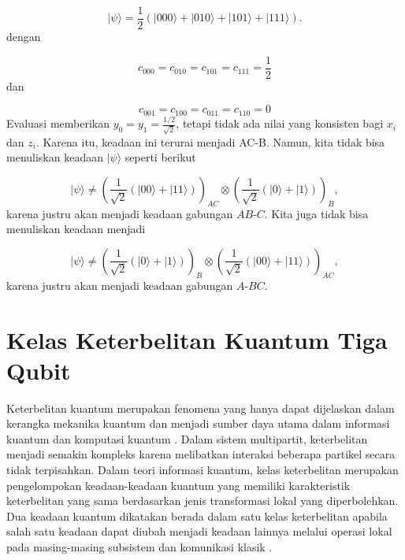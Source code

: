 \begin{equation}
	|\psi\rangle
	=
	\frac{1}{2}
	\left(
	|000\rangle + |010\rangle + |101\rangle + |111\rangle
	\right) .
\end{equation}
dengan

\begin{equation}
	c_{000}=c_{010}=c_{101}=c_{111}=\frac{1}{2}
\end{equation}
dan

\begin{equation}
	c_{001}=c_{100}=c_{011}=c_{110}=0
\end{equation}
Evaluasi memberikan $y_0=y_1=\frac{1/2}{\sqrt{2}}$, tetapi tidak ada nilai yang konsisten bagi $x_i$ dan $z_i$. Karena itu, keadaan ini terurai menjadi AC-B. Namun, kita tidak bisa menuliskan keadaan $|\psi\rangle$ seperti berikut

\begin{equation}
	|\psi\rangle
	\neq
	\left(
	\frac{1}{\sqrt{2}}
	(|00\rangle + |11\rangle)
	\right)_{AC}
	\otimes
	\left(
	\frac{1}{\sqrt{2}}
	(|0\rangle + |1\rangle)
	\right)_B ,
\end{equation}
karena justru akan menjadi keadaan gabungan $AB$-$C$. Kita juga tidak bisa menuliskan keadaan menjadi

\begin{equation}
	|\psi\rangle
	\neq
	\left(
	\frac{1}{\sqrt{2}}
	(|0\rangle + |1\rangle)
	\right)_B
	\otimes
	\left(
	\frac{1}{\sqrt{2}}
	(|00\rangle + |11\rangle)
	\right)_{AC} ,
\end{equation}
karena justru akan menjadi keadaan gabungan $A$-$BC$.

\section{Kelas Keterbelitan Kuantum Tiga Qubit}
\par
Keterbelitan kuantum merupakan fenomena yang hanya dapat dijelaskan dalam kerangka mekanika kuantum dan menjadi sumber daya utama dalam informasi kuantum dan komputasi kuantum \cite{horodecki2009quantum}. Dalam sistem multipartit, keterbelitan menjadi semakin kompleks karena melibatkan interaksi beberapa partikel secara tidak terpisahkan. Dalam teori informasi kuantum, kelas keterbelitan merupakan pengelompokan keadaan-keadaan kuantum yang memiliki karakteristik keterbelitan yang sama berdasarkan jenis transformasi lokal yang diperbolehkan. Dua keadaan kuantum dikatakan berada dalam satu kelas keterbelitan apabila salah satu keadaan dapat diubah menjadi keadaan lainnya melalui operasi lokal pada masing-masing subsistem dan komunikasi klasik \cite{Bennett1996}.

